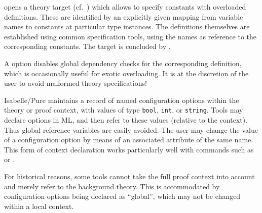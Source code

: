 \begin{isabellebody}
\begin{isamarkuptext}
\begin{descr}
  \item [\hyperlink{command.overloading}{\mbox{\isa{\isacommand{overloading}}}}~\isa{{\isachardoublequote}x\isactrlsub {\isadigit{1}}\ {\isasymequiv}\ c\isactrlsub {\isadigit{1}}\ {\isacharcolon}{\isacharcolon}\ {\isasymtau}\isactrlsub {\isadigit{1}}\ {\isasymAND}\ {\isasymdots}\ x\isactrlsub n\ {\isasymequiv}\ c\isactrlsub n\ {\isacharcolon}{\isacharcolon}\ {\isasymtau}\isactrlsub n\ {\isasymBEGIN}{\isachardoublequote}}]
  opens a theory target (cf.\ ) which allows to
  specify constants with overloaded definitions.  These are identified
  by an explicitly given mapping from variable names  to constants  at particular type
  instances.  The definitions themselves are established using common
  specification tools, using the names  as
  reference to the corresponding constants.  The target is concluded
  by \hyperlink{command.end}{\mbox{}}.

  A  option disables global dependency checks for
  the corresponding definition, which is occasionally useful for
  exotic overloading.  It is at the discretion of the user to avoid
  malformed theory specifications!

  \end{descr}%
\end{isamarkuptext}%
\isamarkuptrue%
%
\isamarkuptrue%
%
\begin{isamarkuptext}%
Isabelle/Pure maintains a record of named configuration options
  within the theory or proof context, with values of type \verb|bool|, \verb|int|, or \verb|string|.  Tools may declare
  options in ML, and then refer to these values (relative to the
  context).  Thus global reference variables are easily avoided.  The
  user may change the value of a configuration option by means of an
  associated attribute of the same name.  This form of context
  declaration works particularly well with commands such as \hyperlink{command.declare}{\mbox{}} or \hyperlink{command.using}{\mbox{}}.

  For historical reasons, some tools cannot take the full proof
  context into account and merely refer to the background theory.
  This is accommodated by configuration options being declared as
  ``global'', which may not be changed within a local context.


\end{isamarkuptext}
\end{isabellebody}
